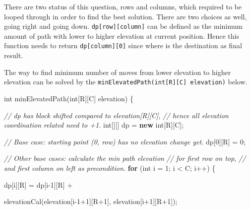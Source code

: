 \documentclass[
]{article}
\author{}
\date{}
\newenvironment{Shaded}{}{}
\newcommand{\CommentTok}[1]{\textcolor[rgb]{0.38,0.63,0.69}{\textit{#1}}}
\newcommand{\ControlFlowTok}[1]{\textcolor[rgb]{0.00,0.44,0.13}{\textbf{#1}}}
\newcommand{\DataTypeTok}[1]{\textcolor[rgb]{0.56,0.13,0.00}{#1}}
\newcommand{\DecValTok}[1]{\textcolor[rgb]{0.25,0.63,0.44}{#1}}
\newcommand{\FunctionTok}[1]{\textcolor[rgb]{0.02,0.16,0.49}{#1}}
\newcommand{\KeywordTok}[1]{\textcolor[rgb]{0.00,0.44,0.13}{\textbf{#1}}}
\newcommand{\NormalTok}[1]{#1}
\newcommand{\OperatorTok}[1]{\textcolor[rgb]{0.40,0.40,0.40}{#1}}
\begin{document}
There are two status of this question, rows and columns, which required
to be looped through in order to find the best solution. There are two
choices as well, going right and going down.
\texttt{dp{[}row{]}{[}column{]}} can be defined as the minimum amount of
path with lower to higher elevation at current position. Hence this
function needs to return \texttt{dp{[}column{]}{[}0{]}} since where is
the destination as final result.

The way to find minimum number of moves from lower elevation to higher
elevation can be solved by the
\texttt{minElevatedPath(int{[}R{]}{[}C{]}\ elevation)} below.

\begin{Shaded}
\begin{Highlighting}[]
\DataTypeTok{int} \FunctionTok{minElevatedPath}\OperatorTok{(}\DataTypeTok{int}\OperatorTok{[}\NormalTok{R}\OperatorTok{][}\NormalTok{C}\OperatorTok{]}\NormalTok{ elevation}\OperatorTok{)} \OperatorTok{\{}

    \CommentTok{// dp has block shifted compared to elevation[R][C],
}
    \CommentTok{// hence all elevation coordination related need to +1.
}
    \DataTypeTok{int}\OperatorTok{[][]}\NormalTok{ dp }\OperatorTok{=} \KeywordTok{new} \DataTypeTok{int}\OperatorTok{[}\NormalTok{R}\OperatorTok{][}\NormalTok{C}\OperatorTok{];}

    \CommentTok{// Base case: starting point (0, row) has no elevation change yet.
}
\NormalTok{    dp}\OperatorTok{[}\DecValTok{0}\OperatorTok{][}\NormalTok{R}\OperatorTok{]} \OperatorTok{=} \DecValTok{0}\OperatorTok{;}

    \CommentTok{// Other base cases: calculate the min path elevation 
}
    \CommentTok{// for first row on top, 
}
    \CommentTok{// and first column on left as precondition.
}
    \ControlFlowTok{for} \OperatorTok{(}\DataTypeTok{int}\NormalTok{ i }\OperatorTok{=} \DecValTok{1}\OperatorTok{;}\NormalTok{ i }\OperatorTok{\textless{}}\NormalTok{ C}\OperatorTok{;}\NormalTok{ i}\OperatorTok{++)} \OperatorTok{\{}

\NormalTok{        dp}\OperatorTok{[}\NormalTok{i}\OperatorTok{][}\NormalTok{R}\OperatorTok{]} \OperatorTok{=}\NormalTok{ dp}\OperatorTok{[}\NormalTok{i}\OperatorTok{{-}}\DecValTok{1}\OperatorTok{][}\NormalTok{R}\OperatorTok{]} \OperatorTok{+} 

            \FunctionTok{elevationCal}\OperatorTok{(}\NormalTok{elevation}\OperatorTok{[}\NormalTok{i}\OperatorTok{{-}}\DecValTok{1}\OperatorTok{+}\DecValTok{1}\OperatorTok{][}\NormalTok{R}\OperatorTok{+}\DecValTok{1}\OperatorTok{],}\NormalTok{ elevation}\OperatorTok{[}\NormalTok{i}\OperatorTok{+}\DecValTok{1}\OperatorTok{][}\NormalTok{R}\OperatorTok{+}\DecValTok{1}\OperatorTok{]);}


\end{Highlighting}
\end{Shaded}
\end{document}
